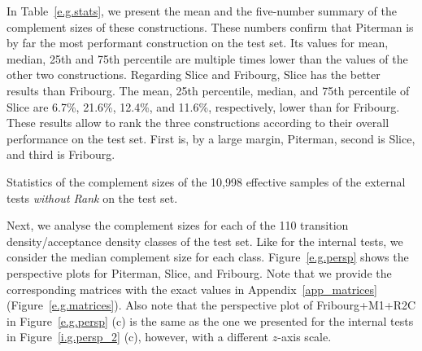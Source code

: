 In Table~\ref{e.g.stats}, we present the mean and the five-number summary of the complement sizes of these constructions. These numbers confirm that Piterman is by far the most performant construction on the \goal{} test set. Its values for mean, median, 25th and 75th percentile are multiple times lower than the values of the other two constructions.  Regarding Slice and Fribourg, Slice has the better results than Fribourg. The mean, 25th percentile, median, and 75th percentile of Slice are 6.7\%, 21.6\%, 12.4\%, and 11.6\%, respectively, lower than for Fribourg. These results allow to rank the three constructions according to their overall performance on the \goal{} test set. First is, by a large margin, Piterman, second is Slice, and third is Fribourg.

\begin{table}[ht]
\centering

\caption{Statistics of the complement sizes of the 10,998 effective samples of the external tests \textit{without Rank} on the \goal{} test set.}
\label{e.g.stats}
\end{table}

Next, we analyse the complement sizes for each of the 110 transition density/acceptance density classes of the \goal{} test set. Like for the internal tests, we consider the median complement size for each class. Figure~\ref{e.g.persp} shows the perspective plots for Piterman, Slice, and Fribourg. Note that we provide the corresponding matrices with the exact values in Appendix~\ref{app_matrices} (Figure~\ref{e.g.matrices}). Also note that the perspective plot of Fribourg+M1+R2C in Figure~\ref{e.g.persp} (c) is the same as the one we presented for the internal tests in Figure~\ref{i.g.persp_2} (c), however, with a different $z$-axis scale.

